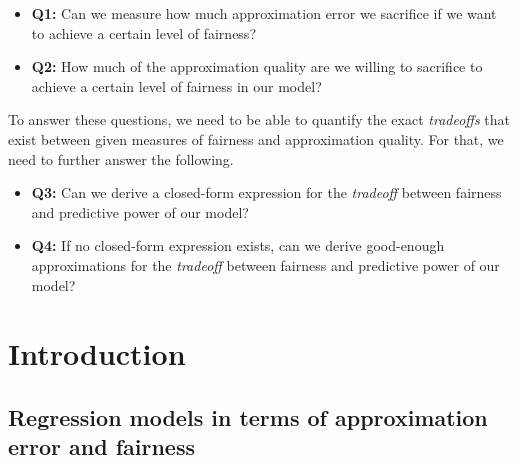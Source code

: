 \documentclass[11pt]{article}
\theoremstyle{plain}
\theoremstyle{definition}
\newcommand{\1}{\mathbf{1}}
\begin{document}
\begin{itemize}
    \item \textbf{Q1:} Can we measure how much approximation error we sacrifice if we want to achieve a certain level of fairness? 
    \item \textbf{Q2:} How much of the approximation quality are we willing to sacrifice to achieve a certain level of fairness in our model? \label{Q1}

\end{itemize}

To answer these questions, we need to be able to quantify the exact \textit{tradeoffs} that exist between given measures of fairness and approximation quality. For that, we need to further answer the following.
\begin{itemize}
    \item \textbf{Q3:} Can we derive a closed-form expression for the \textit{tradeoff} between fairness and predictive power of our model?
    \item \textbf{Q4:} If no closed-form expression exists, can we derive good-enough approximations for the \textit{tradeoff} between fairness and predictive power of our model?
\end{itemize}

\section{Introduction}

\subsection{Regression models in terms of approximation error and fairness}
\end{document}
